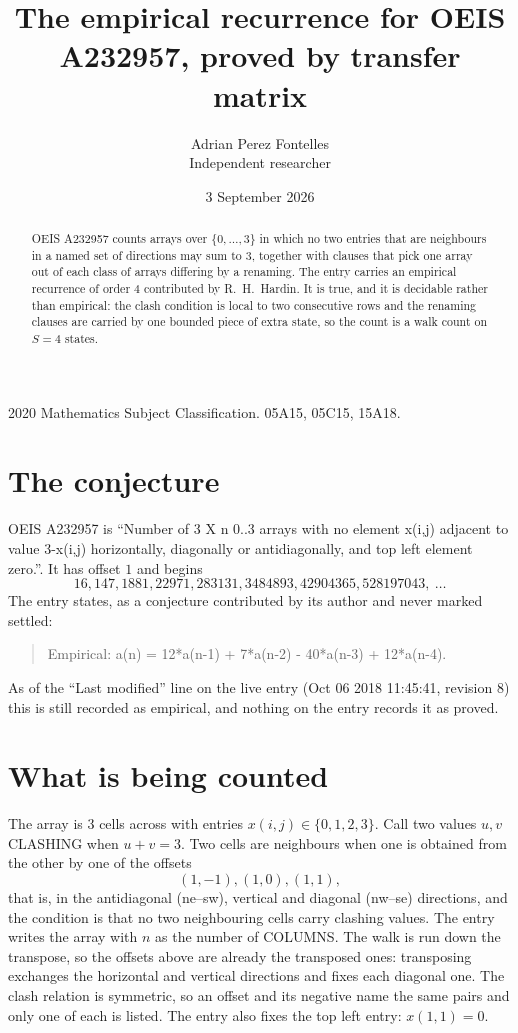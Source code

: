 \documentclass[11pt,a4paper]{article}
\title{The empirical recurrence for OEIS A232957, proved by transfer matrix}
\author{Adrian Perez Fontelles\\ \small Independent researcher}
\date{3 September 2026}
\theoremstyle{plain}
\theoremstyle{definition}
\begin{document}
\maketitle

\begin{abstract}
OEIS A232957 counts arrays over $\{0,\dots,3\}$ in which no two entries that are neighbours in
a named set of directions may sum to $3$, together with clauses that pick one array out of
each class of arrays differing by a renaming. The entry carries an empirical recurrence of
order $4$ contributed by R.~H.~Hardin. It is true, and it is decidable rather than
empirical: the clash condition is local to two consecutive rows and the renaming clauses are
carried by one bounded piece of extra state, so the count is a walk count on $S=4$ states.
\end{abstract}

\noindent\small 2020 Mathematics Subject Classification. 05A15, 05C15, 15A18.\normalsize

\section{The conjecture}

OEIS A232957 is ``Number of 3 X n 0..3 arrays with no element x(i,j) adjacent to value 3-x(i,j) horizontally, diagonally or antidiagonally, and top left element zero.''. It has offset $1$ and begins
\[
16, 147, 1881, 22971, 283131, 3484893, 42904365, 528197043,\ \dots
\]
The entry states, as a conjecture contributed by its author and never marked settled:
\begin{quote}
Empirical: a(n) = 12*a(n-1) + 7*a(n-2) - 40*a(n-3) + 12*a(n-4).
\end{quote}
As of the ``Last modified'' line on the live entry (Oct 06 2018 11:45:41, revision 8) this is still
recorded as empirical, and nothing on the entry records it as proved.

\section{What is being counted}

The array is $3$ cells across with entries $x(i,j)\in\{0,1,2,3\}$. Call two values $u,v$ CLASHING
when $u+v=3$. Two cells are neighbours when one is obtained from the other by one of
the offsets
\[
(1,-1), (1,0), (1,1),
\]
that is, in the antidiagonal (ne--sw), vertical and diagonal (nw--se) directions, and the condition is that no two neighbouring cells carry
clashing values. The entry writes the array with $n$ as the number of COLUMNS. The walk is run down the transpose, so the offsets above are already the transposed ones: transposing exchanges the horizontal and vertical directions and fixes each diagonal one. The clash relation is symmetric, so an offset and its negative name the
same pairs and only one of each is listed. The entry also fixes the top left entry: $x(1,1)=0$.
\end{document}
